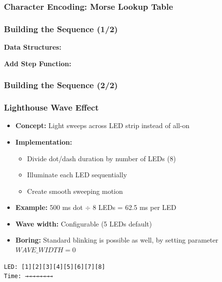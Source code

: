 \documentclass[aspectratio=169, 8pt]{beamer}
\begin{document}
	\begin{frame}[fragile,shrink=10]
		\frametitle{Character Encoding: Morse Lookup Table}
		\vspace{0.5cm}
		
	\end{frame}
	
	\begin{frame}[fragile,shrink=10]
		\frametitle{Building the Sequence (1/2)}
		\vspace{0.5cm}
		\textbf{Data Structures:}
		
		
		\textbf{Add Step Function:}
		
	\end{frame}
	
	\begin{frame}[fragile,shrink=10]
		\vspace{0.5cm}
		\frametitle{Building the Sequence (2/2)}
		
	\end{frame}
	
	\begin{frame}[fragile,shrink=10]
		\frametitle{Lighthouse Wave Effect}
		\begin{itemize}
			\item \textbf{Concept:} Light sweeps across LED strip instead of all-on
			\item \textbf{Implementation:}
			\begin{itemize}
				\item Divide dot/dash duration by number of LEDs (8)
				\item Illuminate each LED sequentially
				\item Create smooth sweeping motion
			\end{itemize}
			\item \textbf{Example:} 500 ms dot $\div$ 8 LEDs = 62.5 ms per LED
			\item \textbf{Wave width:} Configurable (5 LEDs default)
			\item \textbf{Boring:} Standard blinking is possible as well, by setting parameter $WAVE\_WIDTH = 0$
		\end{itemize}
		
		\vspace{0.5cm}
		\begin{center}
			\texttt{LED: [1][2][3][4][5][6][7][8]}\\
			\texttt{Time: →→→→→→→→}
		\end{center}
	\end{frame}
	
\end{document}
